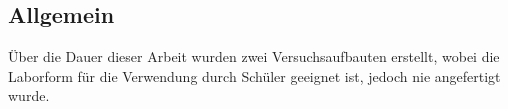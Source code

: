 \subsection{Allgemein}

Über die Dauer dieser Arbeit wurden zwei Versuchsaufbauten erstellt, wobei die Laborform für die Verwendung durch Schüler geeignet ist, jedoch nie angefertigt wurde.

